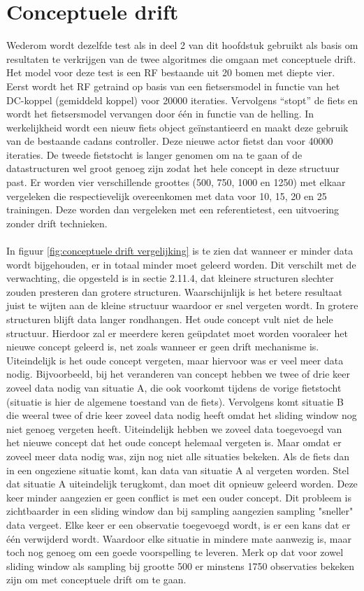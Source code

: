 \section{Conceptuele drift}
Wederom wordt dezelfde test als in deel 2 van dit hoofdstuk gebruikt als basis om resultaten te verkrijgen van de twee algoritmes die omgaan met conceptuele drift. Het model voor deze test is een RF bestaande uit 20 bomen met diepte vier. Eerst wordt het RF getraind op basis van een fietsersmodel in functie van het DC-koppel (gemiddeld koppel) voor 20000 iteraties. Vervolgens “stopt” de fiets en wordt het fietsersmodel vervangen door één in functie van de helling. In werkelijkheid wordt een nieuw fiets object geïnstantieerd en maakt deze gebruik van de bestaande cadans controller. Deze nieuwe actor fietst dan voor 40000 iteraties. De tweede fietstocht is langer genomen om na te gaan of de datastructuren wel groot genoeg zijn zodat het hele concept in deze structuur past. Er worden vier verschillende groottes (500, 750, 1000 en 1250) met elkaar vergeleken die respectievelijk overeenkomen met data voor 10, 15, 20 en 25 trainingen. Deze worden dan vergeleken met een referentietest, een uitvoering zonder drift technieken. 
\\\\
In figuur \ref{fig:conceptuele drift vergelijking} is te zien dat wanneer er minder data wordt bijgehouden, er in totaal minder moet geleerd worden. Dit verschilt met de verwachting, die opgesteld is in sectie 2.11.4, dat kleinere structuren slechter zouden presteren dan grotere structuren. Waarschijnlijk is het betere resultaat juist te wijten aan de kleine structuur waardoor er snel vergeten wordt. In grotere structuren blijft data langer rondhangen. Het oude concept vult niet de hele structuur. Hierdoor zal er meerdere keren geüpdatet moet worden vooraleer het nieuwe concept geleerd is, net zoals wanneer er geen drift mechanisme is. Uiteindelijk is het oude concept vergeten, maar hiervoor was er veel meer data nodig. Bijvoorbeeld, bij het veranderen van concept hebben we twee of drie keer zoveel data nodig van situatie A, die ook voorkomt tijdens de vorige fietstocht (situatie is hier de algemene toestand van de fiets). Vervolgens komt situatie B die weeral twee of drie keer zoveel data nodig heeft omdat het sliding window nog niet genoeg vergeten heeft. Uiteindelijk hebben we zoveel data toegevoegd van het nieuwe concept dat het oude concept helemaal vergeten is. Maar omdat er zoveel meer data nodig was, zijn nog niet alle situaties bekeken. Als de fiets dan in een ongeziene situatie komt, kan data van situatie A al vergeten worden. Stel dat situatie A uiteindelijk terugkomt, dan moet dit opnieuw geleerd worden. Deze keer minder aangezien er geen conflict is met een ouder concept. Dit probleem is zichtbaarder in een sliding window dan bij sampling aangezien sampling "sneller" data vergeet. Elke keer er een observatie toegevoegd wordt, is er een kans dat er één verwijderd wordt. Waardoor elke situatie in mindere mate aanwezig is, maar toch nog genoeg om een goede voorspelling te leveren. Merk op dat voor zowel sliding window als sampling bij grootte 500 er minstens 1750 observaties bekeken zijn om met conceptuele drift om te gaan.

